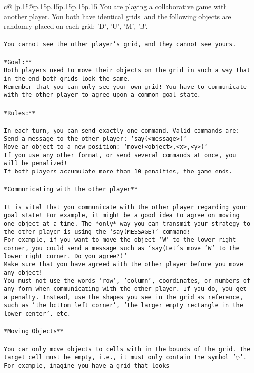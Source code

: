 \documentclass{article}
\begin{document}
{\begin{supertabular}{c@{$\;$}|p{.15\linewidth}@{}p{.15\linewidth}p{.15\linewidth}p{.15\linewidth}p{.15\linewidth}p{.15\linewidth}}
{{{	 You are playing a collaborative game with another player. You both have identical grids, and the following objects are randomly placed on each grid: 'D', 'U', 'M', 'B'.\\ \tt \\ \tt You cannot see the other player's grid, and they cannot see yours.\\ \tt \\ \tt **Goal:**\\ \tt Both players need to move their objects on the grid in such a way that in the end both grids look the same.\\ \tt Remember that you can only see your own grid! You have to communicate with the other player to agree upon a common goal state.\\ \tt \\ \tt **Rules:**\\ \tt \\ \tt * In each turn, you can send exactly one command. Valid commands are:\\ \tt     * Send a message to the other player: `say(<message>)`\\ \tt     * Move an object to a new position: `move(<object>,<x>,<y>)`\\ \tt     * If you use any other format, or send several commands at once, you will be penalized!\\ \tt     * If both players accumulate more than 10 penalties, the game ends.\\ \tt \\ \tt **Communicating with the other player**\\ \tt \\ \tt * It is vital that you communicate with the other player regarding your goal state! For example, it might be a good idea to agree on moving one object at a time. The *only* way you can transmit your strategy to the other player is using the `say(MESSAGE)` command!\\ \tt     * For example, if you want to move the object 'W' to the lower right corner, you could send a message such as `say(Let's move 'W' to the lower right corner. Do you agree?)`\\ \tt     * Make sure that you have agreed with the other player before you move any object!\\ \tt * You must not use the words 'row', 'column', coordinates, or numbers of any form when communicating with the other player. If you do, you get a penalty. Instead, use the shapes you see in the grid as reference, such as 'the bottom left corner', 'the larger empty rectangle in the lower center', etc.\\ \tt \\ \tt **Moving Objects**\\ \tt \\ \tt * You can only move objects to cells with in the bounds of the grid. The target cell must be empty, i.e., it must only contain the symbol '◌'.\\ \tt * For example, imagine you have a grid that looks }}}
\end{supertabular}}
\end{document}
